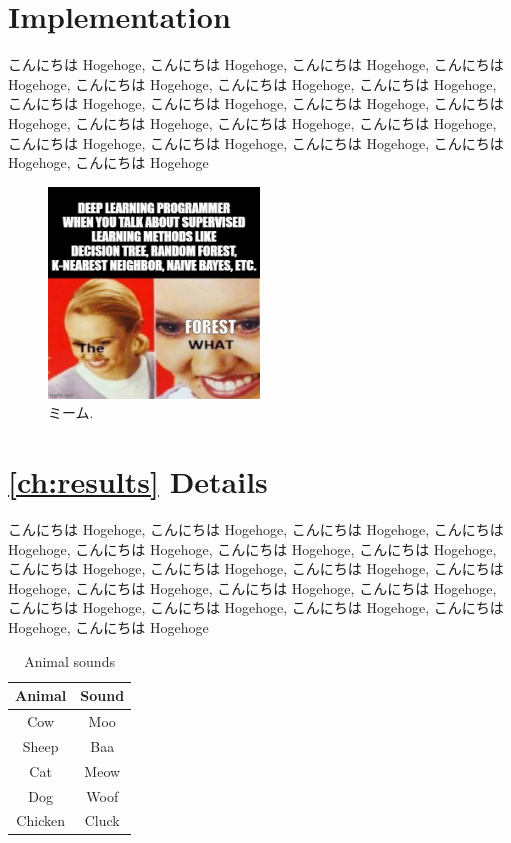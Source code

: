 \appendix

\chapter{Implementation}\label{ch:appx:implement}
こんにちは Hogehoge, こんにちは Hogehoge, こんにちは Hogehoge, こんにちは Hogehoge, こんにちは Hogehoge, こんにちは Hogehoge, こんにちは Hogehoge, こんにちは Hogehoge, こんにちは Hogehoge, こんにちは Hogehoge, こんにちは Hogehoge, こんにちは Hogehoge, こんにちは Hogehoge, こんにちは Hogehoge, こんにちは Hogehoge, こんにちは Hogehoge, こんにちは Hogehoge, こんにちは Hogehoge, こんにちは Hogehoge
\begin{figure}[ht]
    \centering
    \includegraphics[width=0.5\textwidth]{figures/meme.jpg}
    \caption{ミーム.}
    \label{fig:appx:meme}
\end{figure}

\chapter{\cref{ch:results} Details}\label{ch:appx:result-detail}
こんにちは Hogehoge, こんにちは Hogehoge, こんにちは Hogehoge, こんにちは Hogehoge, こんにちは Hogehoge, こんにちは Hogehoge, こんにちは Hogehoge, こんにちは Hogehoge, こんにちは Hogehoge, こんにちは Hogehoge, こんにちは Hogehoge, こんにちは Hogehoge, こんにちは Hogehoge, こんにちは Hogehoge, こんにちは Hogehoge, こんにちは Hogehoge, こんにちは Hogehoge, こんにちは Hogehoge, こんにちは Hogehoge
\begin{table}[h]
\centering
\begin{tabular}{|c|c|}\hline
    \textbf{Animal} & \textbf{Sound} \\\hline
    Cow & Moo \\\hline
    Sheep & Baa \\\hline
    Cat & Meow \\\hline
    Dog & Woof \\\hline
    Chicken & Cluck \\\hline
\end{tabular}
\caption{Animal sounds}
\label{tab:appx:animal-sound}
\end{table}